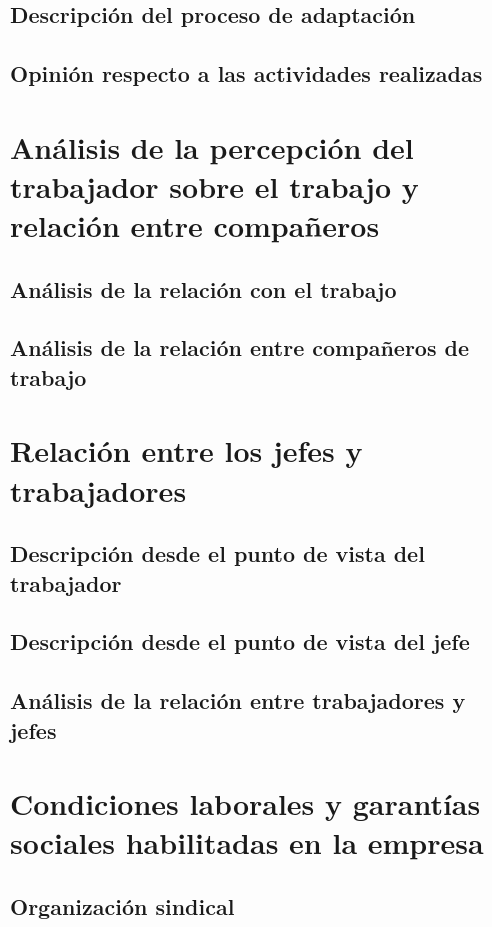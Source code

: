 \subsection{Descripción del proceso de adaptación}
\subsection{Opinión respecto a las actividades realizadas}

\section{Análisis de la percepción del trabajador sobre el trabajo y relación entre compañeros}
\subsection{Análisis de la relación con el trabajo}
\subsection{Análisis de la relación entre compañeros de trabajo}

\section{Relación entre los jefes y trabajadores}
\subsection{Descripción desde el punto de vista del trabajador}
\subsection{Descripción desde el punto de vista del jefe}
\subsection{Análisis de la relación entre trabajadores y jefes}

\section{Condiciones laborales y garantías sociales habilitadas en la empresa}
\subsection{Organización sindical}
